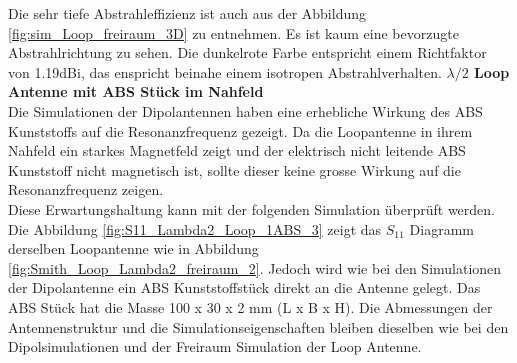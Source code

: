 Die sehr tiefe Abstrahleffizienz ist auch aus der Abbildung \ref{fig:sim_Loop_freiraum_3D} zu entnehmen. Es ist kaum eine bevorzugte Abstrahlrichtung zu sehen. Die dunkelrote Farbe entspricht einem Richtfaktor von 1.19dBi, das enspricht beinahe einem isotropen Abstrahlverhalten.
\newpage
\textbf{$\lambda/2$ Loop Antenne mit ABS Stück im Nahfeld}\\
Die Simulationen der Dipolantennen haben eine erhebliche Wirkung des ABS Kunststoffs auf die Resonanzfrequenz gezeigt. Da die Loopantenne in ihrem Nahfeld ein starkes Magnetfeld zeigt und der elektrisch nicht leitende ABS Kunststoff  nicht magnetisch ist, sollte dieser keine grosse Wirkung auf die Resonanzfrequenz zeigen.\\ Diese Erwartungshaltung kann mit der folgenden Simulation überprüft werden.\\
 
Die Abbildung \ref{fig:S11_Lambda2_Loop_1ABS_3} zeigt das $S_{11}$ Diagramm derselben Loopantenne wie in Abbildung \ref{fig:Smith_Loop_Lambda2_freiraum_2}. Jedoch wird wie bei den Simulationen der Dipolantenne ein ABS Kunststoffstück direkt an die Antenne gelegt. Das ABS Stück hat die Masse 100 x 30 x 2 mm (L x B x H). Die Abmessungen der Antennenstruktur und die Simulationseigenschaften bleiben  dieselben wie bei den Dipolsimulationen und der Freiraum Simulation der Loop Antenne.\\

